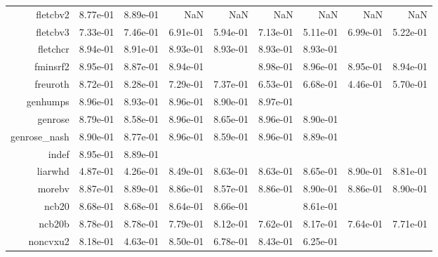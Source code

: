 \begin{tabular}{rrrrrrrrr}
  fletcbv2 &  8.77e-01 &  8.89e-01 &       NaN &       NaN &       NaN &       NaN &       NaN &       NaN \\
  fletcbv3 &  7.33e-01 &  7.46e-01 &  6.91e-01 &  5.94e-01 &  7.13e-01 &  5.11e-01 &  6.99e-01 &  5.22e-01 \\
  fletchcr &  8.94e-01 &  8.91e-01 &  8.93e-01 &  8.93e-01 &  8.93e-01 &  8.93e-01 & \cellcolor{black}{\color{white}{ 8.93e-01}} & \cellcolor{black}{\color{white}{ 8.95e-01}} \\
  fminsrf2 &  8.95e-01 &  8.87e-01 &  8.94e-01 & \cellcolor{black}{\color{white}{ 8.84e-01}} &  8.98e-01 &  8.96e-01 &  8.95e-01 &  8.94e-01 \\
  freuroth &  8.72e-01 &  8.28e-01 &  7.29e-01 &  7.37e-01 &  6.53e-01 &  6.68e-01 &  4.46e-01 &  5.70e-01 \\
  genhumps &  8.96e-01 &  8.93e-01 &  8.96e-01 &  8.90e-01 &  8.97e-01 & \cellcolor{black}{\color{white}{ 8.95e-01}} & \cellcolor{black}{\color{white}{ 8.81e-01}} & \cellcolor{black}{\color{white}{ 8.77e-01}} \\
  genrose &  8.79e-01 &  8.58e-01 &  8.96e-01 &  8.65e-01 &  8.96e-01 &  8.90e-01 & \cellcolor{black}{\color{white}{ 8.96e-01}} & \cellcolor{black}{\color{white}{ 8.62e-01}} \\
  genrose\_nash &  8.90e-01 &  8.77e-01 &  8.96e-01 &  8.59e-01 &  8.96e-01 &  8.89e-01 & \cellcolor{black}{\color{white}{ 8.95e-01}} & \cellcolor{black}{\color{white}{ 8.62e-01}} \\
  indef &  8.95e-01 &  8.89e-01 & \cellcolor{black}{\color{white}{ 8.87e-01}} & \cellcolor{black}{\color{white}{ 8.79e-01}} & \cellcolor{black}{\color{white}{ 8.72e-01}} & \cellcolor{black}{\color{white}{ 8.87e-01}} & \cellcolor{black}{\color{white}{ 8.56e-01}} & \cellcolor{black}{\color{white}{ 8.90e-01}} \\
  liarwhd &  4.87e-01 &  4.26e-01 &  8.49e-01 &  8.63e-01 &  8.63e-01 &  8.65e-01 &  8.90e-01 &  8.81e-01 \\
  morebv &  8.87e-01 &  8.89e-01 &  8.86e-01 &  8.57e-01 &  8.86e-01 &  8.90e-01 &  8.86e-01 &  8.90e-01 \\
  ncb20 &  8.68e-01 &  8.68e-01 &  8.64e-01 &  8.66e-01 & \cellcolor{black}{\color{white}{ 8.66e-01}} &  8.61e-01 & \cellcolor{black}{\color{white}{ 8.70e-01}} & \cellcolor{black}{\color{white}{ 8.69e-01}} \\
  ncb20b &  8.78e-01 &  8.78e-01 &  7.79e-01 &  8.12e-01 &  7.62e-01 &  8.17e-01 &  7.64e-01 &  7.71e-01 \\
  noncvxu2 &  8.18e-01 &  4.63e-01 &  8.50e-01 &  6.78e-01 &  8.43e-01 &  6.25e-01 & \cellcolor{black}{\color{white}{ 5.92e-01}} & \cellcolor{black}{\color{white}{ 4.96e-01}} \\

\end{tabular}
